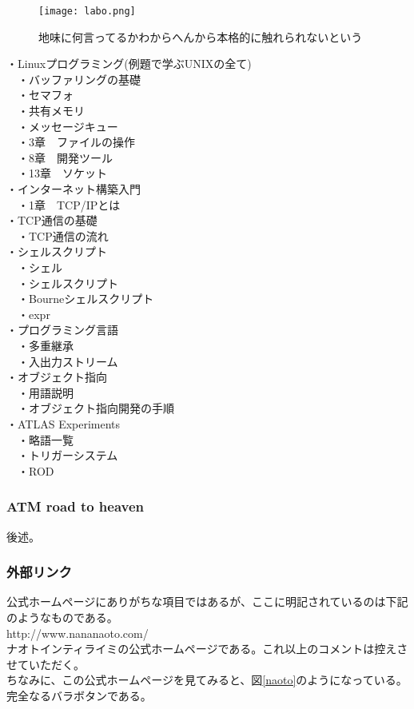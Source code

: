 \begin{figure}[H]
  \centering
  \texttt{[image: labo.png]}
  \caption{地味に何言ってるかわからへんから本格的に触れられないという}
\label{labo}
\end{figure}


・Linuxプログラミング(例題で学ぶUNIXの全て)\\
　・バッファリングの基礎\\
　・セマフォ\\
　・共有メモリ\\
　・メッセージキュー\\
　・3章　ファイルの操作\\
　・8章　開発ツール\\
　・13章　ソケット\\

・インターネット構築入門\\
　・1章　TCP/IPとは\\

・TCP通信の基礎\\
　・TCP通信の流れ\\

・シェルスクリプト\\
　・シェル\\
　・シェルスクリプト\\
　・Bourneシェルスクリプト\\
　・expr\\

・プログラミング言語\\
　・多重継承\\
　・入出力ストリーム\\

・オブジェクト指向\\
　・用語説明\\
　・オブジェクト指向開発の手順\\

・ATLAS Experiments\\
　・略語一覧\\
　・トリガーシステム\\
　・ROD\\

\subsubsection{ATM road to heaven}
後述。
\subsubsection{外部リンク}
公式ホームページにありがちな項目ではあるが、ここに明記されているのは下記のようなものである。\\
http://www.nananaoto.com/\\
ナオトインティライミの公式ホームページである。これ以上のコメントは控えさせていただく。\\
ちなみに、この公式ホームページを見てみると、図\ref{naoto}のようになっている。完全なるバラボタンである。\\

